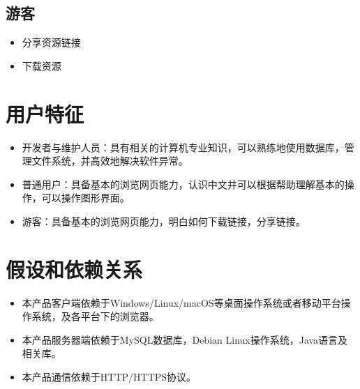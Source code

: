 \subsection{游客}
\begin{itemize}
	\item 分享资源链接
	\item 下载资源
\end{itemize}

\section{用户特征}
\begin{itemize}
	\item 开发者与维护人员：具有相关的计算机专业知识，可以熟练地使用数据库，管理文件系统，并高效地解决软件异常。
	\item 普通用户：具备基本的浏览网页能力，认识中文并可以根据帮助理解基本的操作，可以操作图形界面。
	\item 游客：具备基本的浏览网页能力，明白如何下载链接，分享链接。
\end{itemize}

\section{假设和依赖关系}
\begin{itemize}
	\item 本产品客户端依赖于Windows/Linux/macOS等桌面操作系统或者移动平台操作系统，及各平台下的浏览器。
	\item 本产品服务器端依赖于MySQL数据库，Debian Linux操作系统，Java语言及相关库。
	\item 本产品通信依赖于HTTP/HTTPS协议。
\end{itemize}
